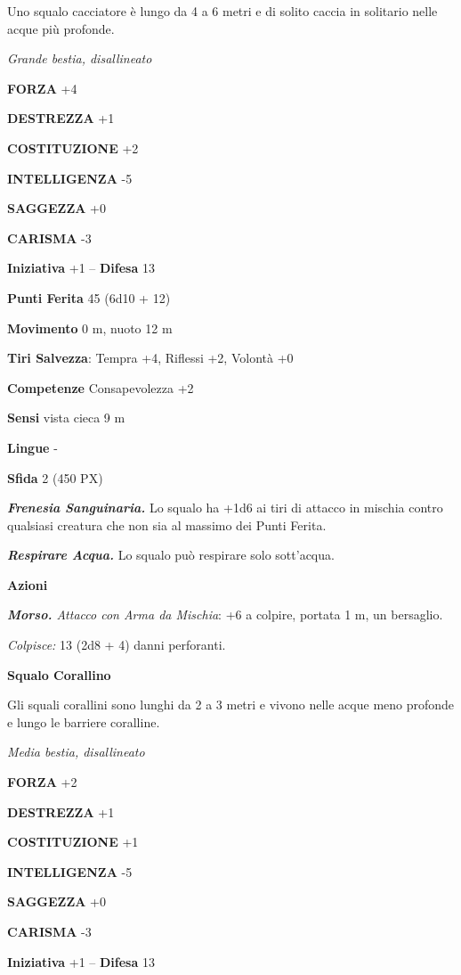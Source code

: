 \begin{multicols}{2}
Uno squalo cacciatore è lungo da 4 a 6 metri e di solito caccia in solitario nelle acque più profonde.

\textit{Grande bestia, disallineato}

\textbf{FORZA} +4

\textbf{DESTREZZA} +1

\textbf{COSTITUZIONE} +2

\textbf{INTELLIGENZA} -5

\textbf{SAGGEZZA} +0

\textbf{CARISMA} -3

\textbf{Iniziativa} +1 -- \textbf{Difesa} 13

\textbf{Punti Ferita} 45 (6d10 + 12)

\textbf{Movimento} 0 m, nuoto 12 m

\textbf{Tiri Salvezza}: Tempra +4, Riflessi +2, Volontà +0

\textbf{Competenze} Consapevolezza +2

\textbf{Sensi} vista cieca 9 m

\textbf{Lingue} -

\textbf{Sfida} 2 (450 PX)

\textit{\textbf{Frenesia Sanguinaria.}} Lo squalo ha +1d6 ai tiri di attacco in mischia contro qualsiasi creatura che non sia al massimo dei Punti Ferita.

\textit{\textbf{Respirare Acqua.}} Lo squalo può respirare solo sott'acqua.

\textbf{Azioni}

\textit{\textbf{Morso.} Attacco con Arma da Mischia}: +6 a colpire, portata 1 m, un bersaglio.

\textit{Colpisce:} 13 (2d8 + 4) danni perforanti.

\medskip\textbf{Squalo Corallino}

Gli squali corallini sono lunghi da 2 a 3 metri e vivono nelle acque meno profonde e lungo le barriere coralline.

\textit{Media bestia, disallineato}

\textbf{FORZA} +2

\textbf{DESTREZZA} +1

\textbf{COSTITUZIONE} +1

\textbf{INTELLIGENZA} -5

\textbf{SAGGEZZA} +0

\textbf{CARISMA} -3

\textbf{Iniziativa} +1 -- \textbf{Difesa} 13


\end{multicols}

